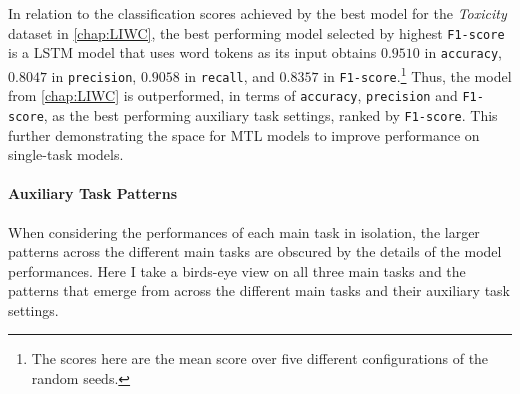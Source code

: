 In relation to the classification scores achieved by the best model for the \textit{Toxicity} dataset in \cref{chap:LIWC}, the best performing model selected by highest \texttt{F1-score} is a LSTM model that uses word tokens as its input obtains $0.9510$ in \texttt{accuracy}, $0.8047$ in \texttt{precision}, $0.9058$ in \texttt{recall}, and $0.8357$ in \texttt{F1-score}.\footnote{The scores here are the mean score over five different configurations of the random seeds.}
Thus, the model from \cref{chap:LIWC} is outperformed, in terms of \texttt{accuracy}, \texttt{precision} and \texttt{F1-score}, as the best performing auxiliary task settings, ranked by \texttt{F1-score}.
This further demonstrating the space for MTL models to improve performance on single-task models.

\paragraph{Auxiliary Task Patterns}
When considering the performances of each main task in isolation, the larger patterns across the different main tasks are obscured by the details of the model performances.
Here I take a birds-eye view on all three main tasks and the patterns that emerge from across the different main tasks and their auxiliary task settings.

